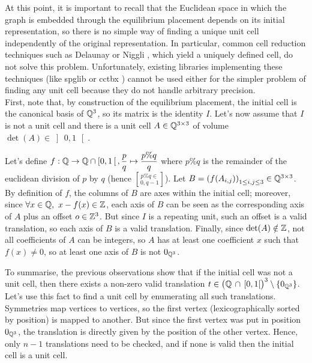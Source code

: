 \documentclass[main.tex]{subfiles}
\begin{document}
At this point, it is important to recall that the Euclidean space in which the graph is embedded through the equilibrium placement depends on its initial representation, so there is no simple way of finding a unique unit cell independently of the original representation. In particular, common cell reduction techniques such as Delaunay \autocite{Delaunay} or Niggli \autocite{Niggli, reducedCell}, which yield a uniquely defined cell, do not solve this problem. Unfortunately, existing libraries implementing these techniques (like spglib \autocite{spglib} or cctbx \autocite{cctbx}) cannot be used either for the simpler problem of finding any unit cell because they do not handle arbitrary precision.
\\

First, note that, by construction of the equilibrium placement, the initial cell is the canonical basis of $\mathbb{Q}^3$, so its matrix is the identity $I$. Let's now assume that $I$ is not a unit cell and there is a unit cell $A\in\mathbb{Q}^{3\times3}$ of volume $\det(A)\in\left]\,0,1\,\right[$.

Let's define $f:\mathbb{Q}\to\mathbb{Q}\cap\left[0,1\,\right[, \displaystyle\frac pq\mapsto\frac{p\%q}q$ where $p\%q$ is the remainder of the euclidean division of $p$ by $q$ (hence $p\%q\in\brack{0,q-1}$). Let $B = \left(f(A_{i,j})\right)_{1\le i,j\le3}\in\mathbb{Q}^{3\times3}$. By definition of $f$, the columns of $B$ are axes within the initial cell; moreover, since $\forall x\in\mathbb{Q},\ x-f(x)\in\mathbb{Z}$, each axis of $B$ can be seen as the corresponding axis of $A$ plus an offset $o\in\mathbb{Z}^3$. But since $I$ is a repeating unit, such an offset is a valid translation, so each axis of $B$ is a valid translation. Finally, since $\det(A)\notin\mathbb{Z}$, not all coefficients of $A$ can be integers, so $A$ has at least one coefficient $x$ such that $f(x)\ne0$, so at least one axis of $B$ is not $0_{\mathbb{Q}^3}$.

To summarise, the previous observations show that if the initial cell was not a unit cell, then there exists a non-zero valid translation $t\in\big(\mathbb{Q}\,\cap\,[0,1[\big)^3\setminus\{0_{\mathbb{Q}^3}\}$.\\

Let's use this fact to find a unit cell by enumerating all such translations. Symmetries map vertices to vertices, so the first vertex (lexicographically sorted by position) is mapped to another. But since the first vertex was put in position $0_{\mathbb{Q}^3}$, the translation is directly given by the position of the other vertex. Hence, only $n-1$ translations need to be checked, and if none is valid then the initial cell is a unit cell.
\end{document}
